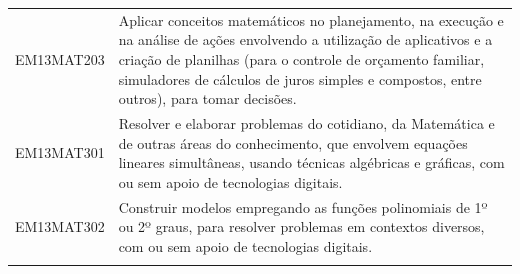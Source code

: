\documentclass[12pt]{extarticle}
\begin{document}
\begin{longtable}{ll}
EM13MAT203 & Aplicar conceitos matemáticos no planejamento, na execução e na análise de ações envolvendo a utilização de aplicativos e a criação de planilhas (para o controle de orçamento familiar, simuladores de cálculos de juros simples e compostos, entre outros), para tomar decisões.                                                                                                                                                                                                                                                                                                                                                                                                                                                                                                                                    \\
\rowcolor[HTML]{E0F7FA} 
EM13MAT301 & Resolver e elaborar problemas do cotidiano, da Matemática e de outras áreas do conhecimento, que envolvem equações lineares simultâneas, usando técnicas algébricas e gráficas, com ou sem apoio de tecnologias digitais.                                                                                                                                                                                                                                                                                                                                                                                                                                                                                                                                                                                             \\
\rowcolor[HTML]{FFF} 
EM13MAT302 & Construir modelos empregando as funções polinomiais de 1º ou 2º graus, para resolver problemas em contextos diversos, com ou sem apoio de tecnologias digitais.                                                                                                                                                                                                                                                                                                                                                                                                                                                                                                                                                                                                                                                       \\
\rowcolor[HTML]{E0F7FA} 

\end{longtable}
\end{document}
